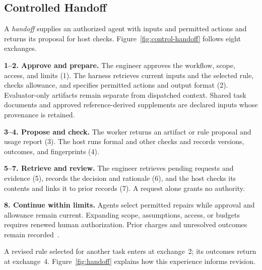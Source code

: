\subsection{Controlled Handoff}
\label{sec:control-handoff}
A \emph{handoff} supplies an authorized agent with inputs and permitted actions and returns its proposal for host checks. Figure~\ref{fig:control-handoff} follows eight exchanges.

\textbf{1--2. Approve and prepare.} The engineer approves the workflow, scope, access, and limits (1). The harness retrieves current inputs and the selected rule, checks allowance, and specifies permitted actions and output format (2). Evaluator-only artifacts remain separate from dispatched context. Shared task documents and approved reference-derived supplements are declared inputs whose provenance is retained.

\textbf{3--4. Propose and check.} The worker returns an artifact or rule proposal and usage report (3). The host runs formal and other checks and records versions, outcomes, and fingerprints (4).

\textbf{5--7. Retrieve and review.} The engineer retrieves pending requests and evidence (5), records the decision and rationale (6), and the host checks its contents and links it to prior records (7). A request alone grants no authority.

\textbf{8. Continue within limits.} Agents select permitted repairs while approval and allowance remain current. Expanding scope, assumptions, access, or budgets requires renewed human authorization. Prior charges and unresolved outcomes remain recorded~\cite{scpCheckpoint}.

A revised rule selected for another task enters at exchange~2; its outcomes return at exchange~4. Figure~\ref{fig:handoff} explains how this experience informs revision.
